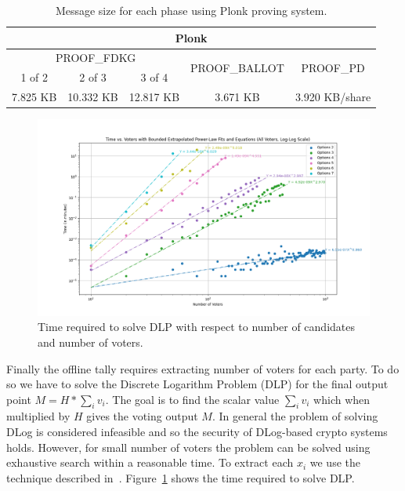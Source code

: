 \documentclass{article}
\begin{document}
\begin{table}
\centering
\label{table:plonk-size}
\caption{Message size for each phase using Plonk proving system.}
\begin{tabular}{|c|c|c|c|c|}
    \hline
    \multicolumn{5}{|c|}{Plonk} \\
    \hline
    \multicolumn{3}{|c|}{\textrm{PROOF}_\textrm{FDKG}} & \multirow{2}{*}{\textrm{PROOF}_\textrm{BALLOT}} & \multirow{2}{*}{\textrm{PROOF}_\textrm{PD}} \\
    \cline{1-3}
    1 of 2 & 2 of 3 & 3 of 4 & & \\
    \hline
    7.825 KB& 10.332 KB & 12.817 KB & 3.671 KB & 3.920 KB/share\\
    \hline
\end{tabular}
\end{table}

\begin{figure}
    \centering
    \includegraphics[width=\textwidth]{dlog-search-time.png}
    \caption{Time required to solve DLP with respect to number of candidates and number of voters.}
    \label{fig:dlog-search}
\end{figure}
Finally the offline tally requires extracting number of voters for each party. To do so we have to solve the Discrete Logarithm Problem (DLP) for the final output point $M = H * \sum_i v_i$. The goal is to find the scalar value $\sum_i v_i$ which when multiplied by $H$ gives the voting output $M$. In general the problem of solving DLog is considered infeasible and so the security of DLog-based crypto systems holds. However, for small number of voters the problem can be solved using exhaustive search within a reasonable time. To extract each $x_i$ we use the technique described in~\cite{haoAnonymousVotingTworound2010}. Figure~\ref{fig:dlog-search} shows the time required to solve DLP.
\end{document}
